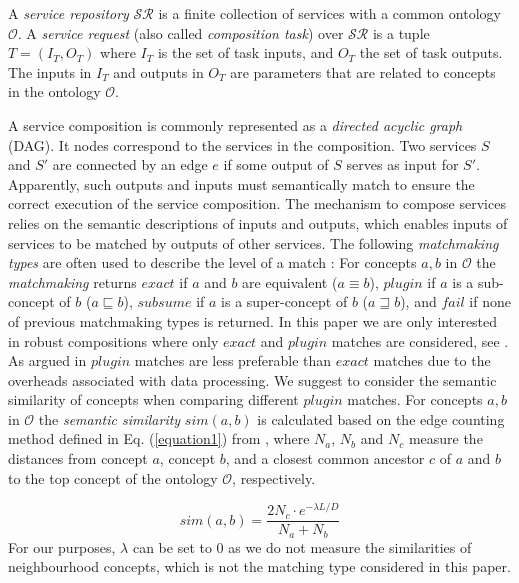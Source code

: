 \documentclass{llncs}
\begin{document}
A \emph{service repository} $\mathcal{SR}$ is a finite collection of services with a common ontology $\mathcal{O}$. A \emph{service request} (also called \emph{composition task}) over $\mathcal{SR}$ is a tuple $T=(I_{T}, O_{T})$ where $I_{T}$ is the set of task inputs, and $O_{T}$ the set of task outputs. The inputs in $I_{T}$ and outputs in $O_{T}$ are parameters that are related to concepts in the ontology $\mathcal{O}$.

A service composition is commonly represented as a \emph{directed acyclic graph} (DAG). It nodes correspond to the services in the composition. Two services $S$ and $S'$ are connected by an edge $e$ if some output of $S$ serves as input for $S'$. Apparently, such outputs and inputs must semantically match to ensure the correct execution of the service composition. 
The mechanism to compose services relies on the semantic descriptions of inputs and outputs, which enables inputs of services to be matched by outputs of other services. The following \emph{matchmaking types} are often used to describe the level of a match \cite{paolucci2002semantic}: For concepts $a, b$ in $\mathcal{O}$ the \emph{matchmaking} returns $exact$ if $a$ and $b$ are equivalent ($a \equiv b$), $plugin$ if $a$ is a sub-concept of $b$ ($a \sqsubseteq b$), $subsume$ if $a$ is a super-concept of $b$ ($a \sqsupseteq b$), and $fail$ if none of previous matchmaking types is returned.
In this paper we are only interested in robust compositions where only $exact$ and $plugin$ matches are considered, see \cite{lecue2009optimizing}. 
%
As argued in \cite{lecue2009optimizing} $plugin$ matches are less preferable than $exact$ matches due to the overheads associated with data processing. We suggest to consider the semantic similarity of concepts when comparing different $plugin$ matches. For concepts $a, b$ in $\mathcal{O}$ the \emph{semantic similarity} $sim(a, b)$ is calculated based on the edge counting method defined in Eq. (\ref{equation1}) from \cite{shet2012new}, where $N_a$, $N_b$ and $N_c$ measure the distances from concept $a$, concept $b$, and a closest common ancestor $c$ of $a$ and $b$ to the top concept of the ontology $\mathcal{O}$, respectively. 
\vspace{-0.2cm}

\begin{equation}
sim(a, b){=} \frac{2N_c \cdot e^{-\lambda L/D} }{N_{a}+N_{b}}
\label{equation1}
\end{equation}
\noindent For our purposes, $\lambda$ can be set to 0 as we do not measure the similarities of neighbourhood concepts, which is not the matching type considered in this paper. 
\end{document}
